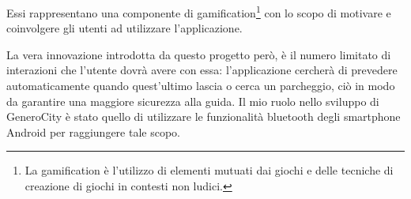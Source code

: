 Essi rappresentano una componente di gamification\footnote{La gamification è l'utilizzo di elementi mutuati dai giochi e delle tecniche di creazione di giochi in contesti non ludici.} con lo scopo di motivare e coinvolgere gli utenti ad utilizzare l'applicazione.

La vera innovazione introdotta da questo progetto però, è il numero limitato di interazioni che l'utente dovrà avere con essa: l'applicazione cercherà di prevedere automaticamente quando quest'ultimo lascia o cerca un parcheggio, ciò in modo da garantire una maggiore sicurezza alla guida. Il mio ruolo nello sviluppo di GeneroCity è stato quello di utilizzare le funzionalità bluetooth degli smartphone Android per raggiungere tale scopo.
